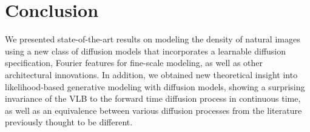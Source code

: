 \documentclass{article}
\begin{document}
\begin{figure}[t]
\begin{floatrow}
\end{floatrow}
\end{figure}

\section{Conclusion}
\label{sec:conclusion}
We presented state-of-the-art results on modeling the density of natural images using a new class of diffusion models that incorporates a learnable diffusion specification, Fourier features for fine-scale modeling, as well as other architectural innovations. In addition, we obtained new theoretical insight into likelihood-based generative modeling with diffusion models, showing a surprising invariance of the VLB to the forward time diffusion process in continuous time, as well as an equivalence between various diffusion processes from the literature previously thought to be different.
\end{document}
